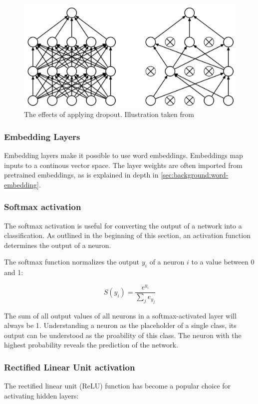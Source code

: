 \begin{figure}
  \centering
  \includegraphics[width=\textwidth]{gfx/dropout-application.png}
  \caption[Effects of applying dropout]{The effects of applying dropout. Illustration taken from~\cite{srivastava2014dropout}}
  \label{fig:dropout-application}
\end{figure}

\subsubsection*{Embedding Layers}
Embedding layers make it possible to use word embeddings.
Embeddings map inputs to a continous vector space.
The layer weights are often imported from pretrained embeddings, as is explained in depth in \autoref{sec:background:word-embedding}.

\subsubsection*{Softmax activation}
The softmax activation is useful for converting the output of a network into a classification.
As outlined in the beginning of this section, an activation function determines the output of a neuron.

The softmax function normalizes the output $y_i$ of a neuron $i$ to a value between 0 and 1:

$$S(y_i) = \frac{e^{y_i}}{\sum_j e_{y_j}}$$

The sum of all output values of all neurons in a softmax-activated layer will always be 1.
Understanding a neuron as the placeholder of a single class, its output can be understood as the proability of this class.
The neuron with the highest probability reveals the prediction of the network.

\subsubsection*{Rectified Linear Unit activation}
The rectified linear unit (ReLU) function has become a popular choice for activating hidden layers:

